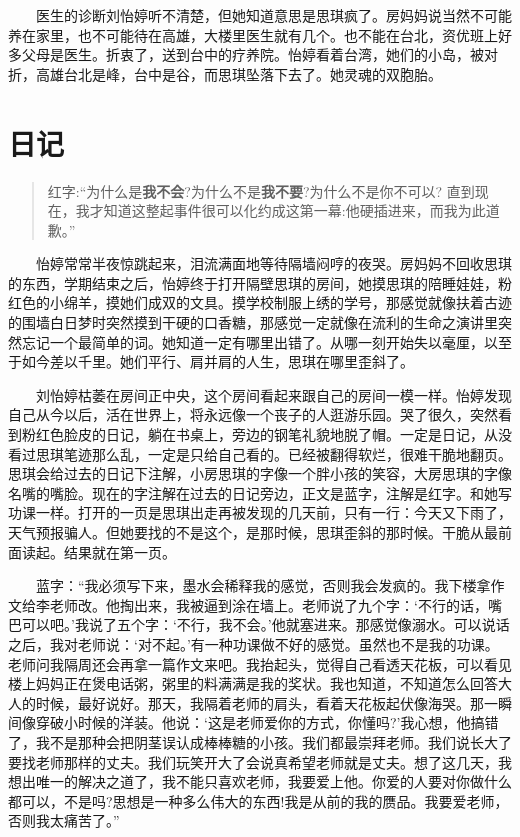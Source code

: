 \documentclass[12pt,UTF8]{ctexbook}
\begin{document}
　　医生的诊断刘怡婷听不清楚，但她知道意思是思琪疯了。房妈妈说当然不可能养在家里，也不可能待在高雄，大楼里医生就有几个。也不能在台北，资优班上好多父母是医生。折衷了，送到台中的疗养院。怡婷看着台湾，她们的小岛，被对折，高雄台北是峰，台中是谷，而思琪坠落下去了。她灵魂的双胞胎。

\hypertarget{ux65e5ux8bb0}{%
\section*{日记}\label{ux65e5ux8bb0}}

\begin{quote}
红字:\enquote{为什么是\textbf{我不会}?为什么不是\textbf{我不要}?为什么不是你不可以? 直到现在，我才知道这整起事件很可以化约成这第一幕:他硬插进来，而我为此道歉。}
\end{quote}

　　怡婷常常半夜惊跳起来，泪流满面地等待隔墙闷哼的夜哭。房妈妈不回收思琪的东西，学期结束之后，怡婷终于打开隔壁思琪的房间，她摸思琪的陪睡娃娃，粉红色的小绵羊，摸她们成双的文具。摸学校制服上绣的学号，那感觉就像扶着古迹的围墙白日梦时突然摸到干硬的口香糖，那感觉一定就像在流利的生命之演讲里突然忘记一个最简单的词。她知道一定有哪里出错了。从哪一刻开始失以毫厘，以至于如今差以千里。她们平行、肩并肩的人生，思琪在哪里歪斜了。

　　刘怡婷枯萎在房间正中央，这个房间看起来跟自己的房间一模一样。怡婷发现自己从今以后，活在世界上，将永远像一个丧子的人逛游乐园。哭了很久，突然看到粉红色脸皮的日记，躺在书桌上，旁边的钢笔礼貌地脱了帽。一定是日记，从没看过思琪笔迹那么乱，一定是只给自己看的。已经被翻得软烂，很难干脆地翻页。思琪会给过去的日记下注解，小房思琪的字像一个胖小孩的笑容，大房思琪的字像名嘴的嘴脸。现在的字注解在过去的日记旁边，正文是蓝字，注解是红字。和她写功课一样。打开的一页是思琪出走再被发现的几天前，只有一行：今天又下雨了，天气预报骗人。但她要找的不是这个，是那时候，思琪歪斜的那时候。干脆从最前面读起。结果就在第一页。

　　蓝字：\enquote{我必须写下来，墨水会稀释我的感觉，否则我会发疯的。我下楼拿作文给李老师改。他掏出来，我被逼到涂在墙上。老师说了九个字：`不行的话，嘴巴可以吧。'我说了五个字：`不行，我不会。'他就塞进来。那感觉像溺水。可以说话之后，我对老师说：`对不起。'有一种功课做不好的感觉。虽然也不是我的功课。老师问我隔周还会再拿一篇作文来吧。我抬起头，觉得自己看透天花板，可以看见楼上妈妈正在煲电话粥，粥里的料满满是我的奖状。我也知道，不知道怎么回答大人的时候，最好说好。那天，我隔着老师的肩头，看着天花板起伏像海哭。那一瞬间像穿破小时候的洋装。他说：`这是老师爱你的方式，你懂吗?'我心想，他搞错了，我不是那种会把阴茎误认成棒棒糖的小孩。我们都最崇拜老师。我们说长大了要找老师那样的丈夫。我们玩笑开大了会说真希望老师就是丈夫。想了这几天，我想出唯一的解决之道了，我不能只喜欢老师，我要爱上他。你爱的人要对你做什么都可以，不是吗?思想是一种多么伟大的东西!我是从前的我的赝品。我要爱老师，否则我太痛苦了。}
\end{document}
